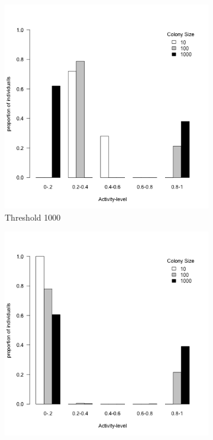 \documentclass[a4paper]{article}
\begin{document}
\begin{figure}[!ht]
	\begin{subfigure}[b]{0.45\linewidth}
      \includegraphics[width=\linewidth]{Threshold_1_task_and_5_demand_with_1000T}
		\caption{Threshold 1000}\label{fig:1a}		
	\end{subfigure}
    \hfill
    \begin{subfigure}[b]{0.45\linewidth}
      \includegraphics[width=\linewidth]{Threshold_1_task_and_5_demand_and_1000000T}

\end{subfigure}
\end{figure}
\end{document}
